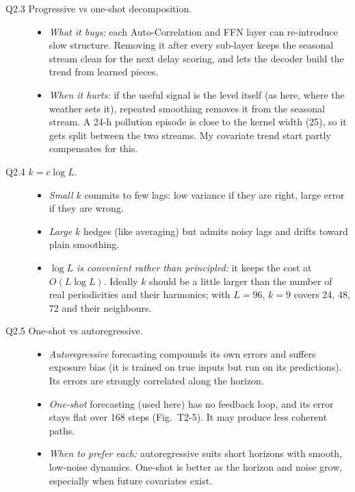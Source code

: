 \begin{description}
\item[Q2.3 Progressive vs one-shot decomposition.]
\begin{itemize}
\item \emph{What it buys:} each Auto-Correlation and FFN layer can re-introduce slow structure. Removing it after every sub-layer keeps the seasonal stream clean for the next delay scoring, and lets the decoder build the trend from learned pieces.
\item \emph{When it hurts:} if the useful signal is the level itself (as here, where the weather sets it), repeated smoothing removes it from the seasonal stream. A 24-h pollution episode is close to the kernel width (25), so it gets split between the two streams. My covariate trend start partly compensates for this.
\end{itemize}

\item[Q2.4 $k=c\log L$.]
\begin{itemize}
\item \emph{Small $k$} commits to few lags: low variance if they are right, large error if they are wrong.
\item \emph{Large $k$} hedges (like averaging) but admits noisy lags and drifts toward plain smoothing.
\item \emph{$\log L$ is convenient rather than principled:} it keeps the cost at $O(L\log L)$. Ideally $k$ should be a little larger than the number of real periodicities and their harmonics; with $L=96$, $k=9$ covers 24, 48, 72 and their neighbours.
\end{itemize}

\item[Q2.5 One-shot vs autoregressive.]
\begin{itemize}
\item \emph{Autoregressive} forecasting compounds its own errors and suffers exposure bias (it is trained on true inputs but run on its predictions). Its errors are strongly correlated along the horizon.
\item \emph{One-shot} forecasting (used here) has no feedback loop, and its error stays flat over 168 steps (Fig.~T2-5). It may produce less coherent paths.
\item \emph{When to prefer each:} autoregressive suits short horizons with smooth, low-noise dynamics. One-shot is better as the horizon and noise grow, especially when future covariates exist.
\end{itemize}


\end{description}
